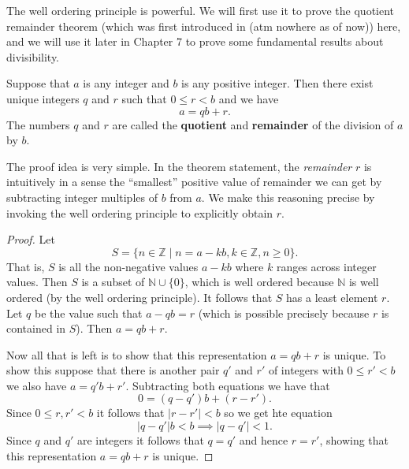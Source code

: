 The well ordering principle is powerful. We will first use it to prove the quotient remainder theorem (which was first introduced in (atm nowhere as of now)) here, and we will use it later in Chapter 7 to prove some fundamental results about divisibility.

\begin{theorem}
Suppose that $a$ is any integer and $b$ is any positive integer. Then there exist unique integers $q$ and $r$ such that $0 \leq r < b$ and we have
\[a = qb + r.\]
The numbers $q$ and $r$ are called the \textbf{quotient} and \textbf{remainder} of the division of $a$ by $b$.
\end{theorem}
The proof idea is very simple. In the theorem statement, the \textit{remainder} $r$ is intuitively in a sense the ``smallest'' positive value of remainder we can get by subtracting integer multiples of $b$ from $a$. We make this reasoning precise by invoking the well ordering principle to explicitly obtain $r$.
\begin{proof}
Let 
\[S = \{n \in \mathbb{Z} \mid n = a-kb, k\in\mathbb{Z}, n \geq 0\}.\] That is, $S$ is all the non-negative values $a - kb$ where $k$ ranges across integer values. Then $S$ is a subset of $\mathbb{N} \cup \{0\}$, which is well ordered because $\mathbb{N}$ is well ordered (by the well ordering principle). It follows that $S$ has a least element $r$. Let $q$ be the value such that $a - qb = r$ (which is possible precisely because $r$ is contained in $S$). Then $a = qb + r$.

Now all that is left is to show that this representation $a = qb + r$ is unique. To show this suppose that there is another pair $q'$ and $r'$ of integers with $0 \leq r' < b$ we also have $a = q'b + r'$. Subtracting both equations we have that
\[0 = (q - q')b + (r-r').\] Since $0 \leq r, r' < b$ it follows that $|r - r'| < b$ so we get hte equation
\[|q - q'|b < b \implies |q - q'| < 1.\] Since $q$ and $q'$ are integers it follows that $q = q'$ and hence $r = r'$, showing that this representation $a = qb + r$ is unique.
\end{proof}


